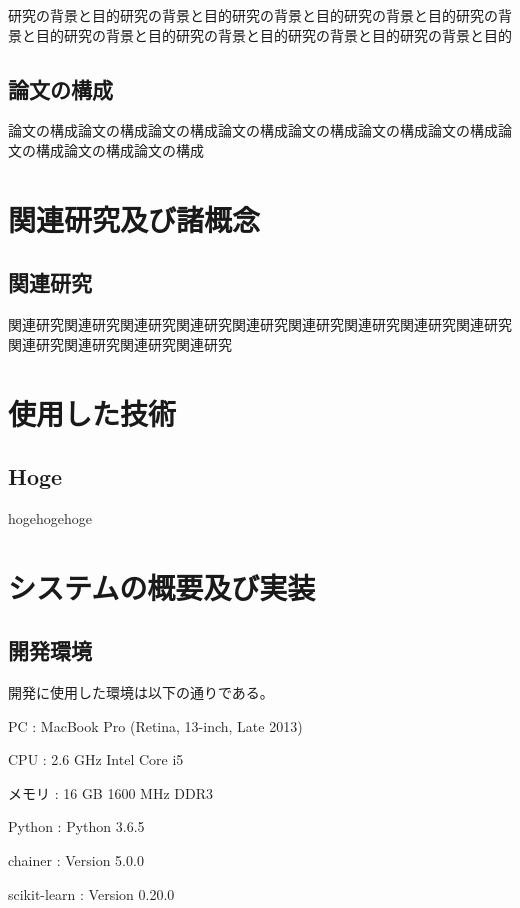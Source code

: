 \documentclass[11pt,a4j,uplatex]{jarticle}
\begin{document}
    研究の背景と目的研究の背景と目的研究の背景と目的研究の背景と目的研究の背景と目的研究の背景と目的研究の背景と目的研究の背景と目的研究の背景と目的

    \subsection{論文の構成}

    論文の構成論文の構成論文の構成論文の構成論文の構成論文の構成論文の構成論文の構成論文の構成論文の構成

\newpage

\section{関連研究及び諸概念}

    \subsection{関連研究}
    関連研究関連研究関連研究関連研究関連研究関連研究関連研究関連研究関連研究関連研究関連研究関連研究関連研究


\newpage

\section{使用した技術}

    \subsection{Hoge}
    hogehogehoge

\newpage

\section{システムの概要及び実装}
    \subsection{開発環境}
    開発に使用した環境は以下の通りである。

    PC : MacBook Pro (Retina, 13-inch, Late 2013)

    CPU : 2.6 GHz Intel Core i5

    メモリ : 16 GB 1600 MHz DDR3

    Python : Python 3.6.5

    chainer : Version 5.0.0

    scikit-learn : Version 0.20.0
\end{document}
